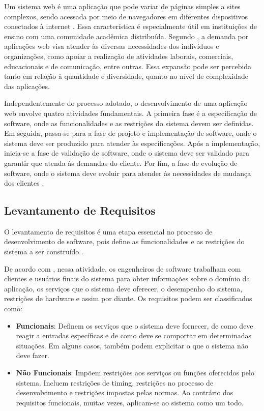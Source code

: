 Um sistema web é uma aplicação que pode variar de páginas simples a sites complexos, sendo acessada por meio de navegadores em diferentes dispositivos conectados à internet \cite{pressman2016engenharia}. Essa característica é especialmente útil em instituições de ensino com uma comunidade acadêmica distribuída. Segundo , a demanda por aplicações web visa atender às diversas necessidades dos indivíduos e organizações, como apoiar a realização de atividades laborais, comerciais, educacionais e de comunicação, entre outras. Essa expansão pode ser percebida tanto em relação à quantidade e diversidade, quanto no nível de complexidade das aplicações.

Independentemente do processo adotado, o desenvolvimento de uma aplicação web envolve quatro atividades fundamentais. A primeira fase é a especificação de software, onde as funcionalidades e as restrições do sistema devem ser definidas. Em seguida, passa-se para a fase de projeto e implementação de software, onde o sistema deve ser produzido para atender às especificações. Após a implementação, inicia-se a fase de validação de software, onde o sistema deve ser validado para garantir que atenda às demandas do cliente. Por fim, a fase de evolução de software, onde o sistema deve evoluir para atender às necessidades de mudança dos clientes \cite{sommerville2011engenharia}.

\subsection{Levantamento de Requisitos}

O levantamento de requisitos é uma etapa essencial no processo de desenvolvimento de software, pois define as funcionalidades e as restrições do sistema a ser construído \cite{Balieiro_Pinto_2025}.

De acordo com , nessa atividade, os engenheiros de software trabalham com clientes e usuários finais do sistema para obter informações sobre o domínio da aplicação, os serviços que o sistema deve oferecer, o desempenho do sistema, restrições de hardware e assim por diante. Os requisitos podem ser classificados como:

\begin{itemize}
    \item \textbf{Funcionais}: Definem os serviços que o sistema deve fornecer, de como deve reagir a entradas específicas e de como deve se comportar em determinadas situações. Em alguns casos, também podem explicitar o que o sistema não deve fazer.
    \item \textbf{Não Funcionais}: Impõem restrições aos serviços ou funções oferecidos pelo sistema. Incluem restrições de timing, restrições no processo de desenvolvimento e restrições impostas pelas normas. Ao contrário dos requisitos funcionais, muitas vezes, aplicam-se ao sistema como um todo.
\end{itemize}

